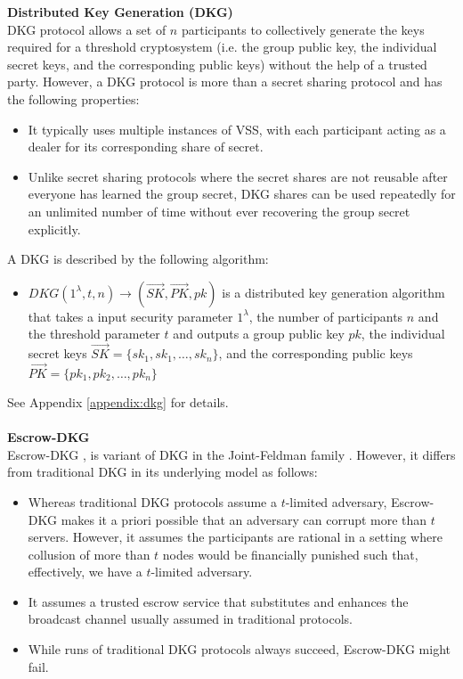 \documentclass[letterpaper,twocolumn,10pt]{article}
\theoremstyle{definition}
\theoremstyle{remark}
\begin{document}
\textbf{Distributed Key Generation (DKG)}\\
DKG protocol allows a set of $n$ participants to collectively generate the keys required for a threshold cryptosystem (i.e. the group public key, the individual secret keys, and the corresponding public keys) without the help of a trusted party. However, a DKG protocol is more than a secret sharing protocol and has the following properties:
\begin{itemize}
    \item It typically uses multiple instances of VSS, with each participant acting as a dealer for its corresponding share of secret. 
    \item Unlike secret sharing protocols where the secret shares are not reusable after everyone has learned the group secret, DKG shares can be used repeatedly for an unlimited number of time without ever recovering the group secret explicitly.
\end{itemize}
A DKG is described by the following algorithm:
\begin{itemize}
    \item $DKG(1^{\lambda}, t, n) \rightarrow (\vec{SK}, \vec{PK}, pk)$ is a distributed key generation algorithm that takes a input security parameter $1^\lambda$, the number of participants $n$ and the threshold parameter $t$ and outputs a group public key $pk$, the individual secret keys $\vec{SK} = \{sk_1, sk_1, \ldots, sk_n\}$, and the corresponding public keys $\vec{PK} = \{pk_1, pk_2, \ldots, pk_n\}$
\end{itemize}
 See Appendix \ref{appendix:dkg} for details.\\\\
\textbf{Escrow-DKG}\\
Escrow-DKG \cite{david2019rational}, is variant of DKG in the Joint-Feldman
family \cite{gennaro1999secure, gennaro3revisiting}. However, it differs from traditional DKG in its underlying model as follows:
\begin{itemize}
    \item Whereas traditional DKG protocols assume a $t$-limited adversary, Escrow-DKG makes it a priori possible that an adversary can corrupt more than $t$ servers. However, it assumes the participants are rational in a setting where collusion of more than $t$ nodes would be financially punished such that, effectively, we have a $t$-limited adversary.
    \item It assumes a trusted escrow service that substitutes and enhances the broadcast channel usually assumed in traditional protocols.
    \item While runs of traditional DKG protocols always succeed, Escrow-DKG might fail.
\end{itemize}
\end{document}
